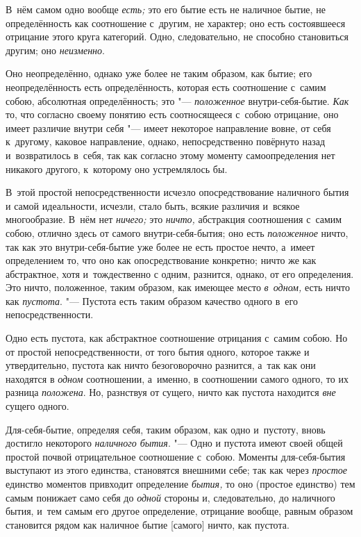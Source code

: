 
В~нём самом одно вообще {\em есть;} это его бытие есть
не наличное бытие, не определённость как соотношение с~другим, не характер;
оно есть состоявшееся отрицание этого круга категорий. Одно, следовательно,
не способно становиться другим; оно {\em неизменно}.

Оно неопределённо, однако уже более не таким образом, как бытие; его
неопределённость есть определённость, которая есть соотношение с~самим
собою, абсолютная определённость; это
"--- {\em положенное} внутри-себя-бытие.
{\em Как} то, что согласно своему понятию есть
соотносящееся с~собою отрицание, оно имеет различие внутри себя "--- имеет
некоторое направление вовне, от себя к~другому, каковое направление,
однако, непосредственно повёрнуто назад и~возвратилось в~себя, так как
согласно этому моменту самоопределения нет никакого другого, к~которому оно
устремлялось бы.

В~этой простой непосредственности исчезло опосредствование наличного бытия и
самой идеальности, исчезли, стало быть, всякие различия и~всякое
многообразие. В~нём нет {\em ничего;} это
{\em ничто,} абстракция соотношения с~самим собою,
отлично здесь от самого внутри-себя-бытия; оно есть
{\em положенное} ничто, так как это внутри-себя-бытие
уже более не есть простое нечто, а~имеет определением то, что оно как
опосредствование конкретно; ничто же как абстрактное, хотя и~тождественно с
одним, разнится, однако, от его определения. Это ничто, положенное, таким
образом, как имеющее место {\em в~одном,} есть ничто
как {\em пустота}. "--- Пустота есть таким образом
качество одного в~его непосредственности.


Одно есть пустота, как абстрактное соотношение отрицания с~самим собою. Но
от простой непосредственности, от того бытия одного, которое также и
утвердительно, пустота как ничто безоговорочно разнится, а~так как они
находятся в {\em одном} соотношении, а~именно, в
соотношении самого одного, то их разница
{\em положена}. Но, разнствуя от сущего, ничто как
пустота находится {\em вне} сущего одного.

Для-себя-бытие, определяя себя, таким образом, как одно и~пустоту, вновь
достигло некоторого {\em наличного бытия}. "--- Одно и
пустота имеют своей общей простой почвой отрицательное соотношение с~собою.
Моменты для-себя-бытия выступают из этого единства, становятся внешними
себе; так как через {\em простое} единство моментов
привходит определение {\em бытия,} то оно (простое
единство) тем самым понижает само себя до {\em одной}
стороны и, следовательно, до наличного бытия, и~тем самым его другое
определение, отрицание вообще, равным образом становится рядом как наличное
бытие [самого] ничто, как пустота.

